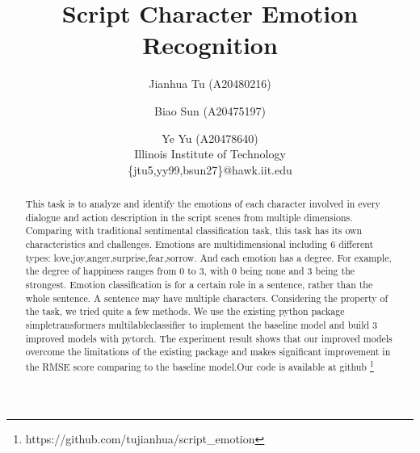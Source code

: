 \documentclass[12pt,twocolumn,letterpaper]{article}
\begin{document}
\title{Script Character Emotion Recognition}

\author{Jianhua Tu (A20480216)\\
\and Biao Sun (A20475197)\\
\and Ye Yu (A20478640)\\
Illinois Institute of Technology\\ 
\{jtu5,yy99,bsun27\}@hawk.iit.edu
}

\maketitle

\begin{abstract}
This task is to analyze and identify the emotions of each character involved in every dialogue and action description in the script scenes from multiple dimensions. Comparing with traditional sentimental classification task, this task has its own characteristics and challenges. Emotions are multidimensional including 6 different types: love,joy,anger,surprise,fear,sorrow. And each emotion has a degree. For example, the degree of happiness ranges from 0 to 3, with 0 being none and 3 being the strongest.  Emotion classification is for a certain role in a sentence, rather than the whole sentence. A sentence may have multiple characters.  Considering the property of the task, we tried quite a few methods. We use the existing python package simpletransformers multilableclassifier to implement the baseline model and build 3 improved models with pytorch. The experiment result shows that our improved models overcome the limitations of the existing package and makes significant improvement in the RMSE score comparing to the baseline model.Our code is available at github \footnote{https://github.com/tujianhua/script\_emotion}
\end{abstract}

\end{document}
